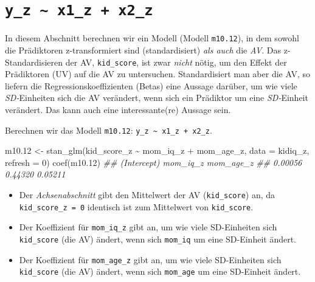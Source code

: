 \documentclass[
  ngerman,
  letterpaper,
  twoside,
  open=any]{scrbook}
\newenvironment{Shaded}{\begin{snugshade}}{\end{snugshade}}
\newcommand{\AttributeTok}[1]{\textcolor[rgb]{0.40,0.45,0.13}{#1}}
\newcommand{\DecValTok}[1]{\textcolor[rgb]{0.68,0.00,0.00}{#1}}
\newcommand{\DocumentationTok}[1]{\textcolor[rgb]{0.37,0.37,0.37}{\textit{#1}}}
\newcommand{\FloatTok}[1]{\textcolor[rgb]{0.68,0.00,0.00}{#1}}
\newcommand{\FunctionTok}[1]{\textcolor[rgb]{0.28,0.35,0.67}{#1}}
\newcommand{\NormalTok}[1]{\textcolor[rgb]{0.00,0.23,0.31}{#1}}
\newcommand{\OtherTok}[1]{\textcolor[rgb]{0.00,0.23,0.31}{#1}}
\newcommand{\SpecialCharTok}[1]{\textcolor[rgb]{0.37,0.37,0.37}{#1}}
\providecommand{\tightlist}{%
  \setlength{\itemsep}{0pt}\setlength{\parskip}{0pt}}\usepackage{longtable,booktabs,array}
\theoremstyle{definition}
\theoremstyle{plain}
\theoremstyle{definition}
\theoremstyle{definition}
\theoremstyle{definition}
\theoremstyle{definition}
\theoremstyle{remark}
\begin{document}
\section{\texorpdfstring{\texttt{y\_z\ \textasciitilde{}\ x1\_z\ +\ x2\_z}}{y\_z \textasciitilde{} x1\_z + x2\_z}}\label{y_z-x1_z-x2_z}

In diesem Abschnitt berechnen wir ein Modell (Modell \texttt{m10.12}),
in dem sowohl die Prädiktoren z-transformiert sind (standardisiert)
\emph{als auch} die \emph{AV}. Das z-Standardisieren der AV,
\texttt{kid\_score}, ist zwar \emph{nicht} nötig, um den Effekt der
Prädiktoren (UV) auf die AV zu untersuchen. Standardisiert man aber die
AV, so liefern die Regressionskoeffizienten (Betas) eine Aussage
darüber, um wie viele \emph{SD-}Einheiten sich die AV verändert, wenn
sich ein Prädiktor um eine \emph{SD-}Einheit verändert. Das kann auch
eine interessante(re) Aussage sein.

Berechnen wir das Modell \texttt{m10.12}:
\texttt{y\_z\ \textasciitilde{}\ x1\_z\ +\ x2\_z}.

\begin{Shaded}
\begin{Highlighting}[]
\NormalTok{m10}\FloatTok{.12} \OtherTok{\textless{}{-}} \FunctionTok{stan\_glm}\NormalTok{(kid\_score\_z }\SpecialCharTok{\textasciitilde{}}\NormalTok{ mom\_iq\_z }\SpecialCharTok{+}\NormalTok{ mom\_age\_z, }
                   \AttributeTok{data =}\NormalTok{ kidiq\_z, }
                   \AttributeTok{refresh =} \DecValTok{0}\NormalTok{)}
\FunctionTok{coef}\NormalTok{(m10}\FloatTok{.12}\NormalTok{)}
\DocumentationTok{\#\# (Intercept)    mom\_iq\_z   mom\_age\_z }
\DocumentationTok{\#\#     0.00056     0.44320     0.05211}
\end{Highlighting}
\end{Shaded}

\begin{itemize}
\tightlist
\item
  Der \emph{Achsenabschnitt} gibt den Mittelwert der AV
  (\texttt{kid\_score}) an, da \texttt{kid\_score\_z\ =\ 0} identisch
  ist zum Mittelwert von \texttt{kid\_score}.
\item
  Der Koeffizient für \texttt{mom\_iq\_z} gibt an, um wie viele
  SD-Einheiten sich \texttt{kid\_score} (die AV) ändert, wenn sich
  \texttt{mom\_iq} um eine SD-Einheit ändert.
\item
  Der Koeffizient für \texttt{mom\_age\_z} gibt an, um wie viele
  SD-Einheiten sich \texttt{kid\_score} (die AV) ändert, wenn sich
  \texttt{mom\_age} um eine SD-Einheit ändert.
\end{itemize}
\end{document}
